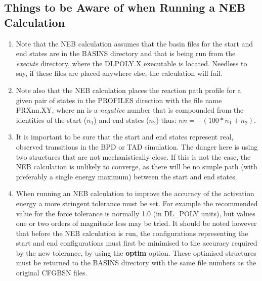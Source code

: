 \subsection{Things to be Aware of when Running a NEB Calculation}

\begin{enumerate}
\item Note that the NEB calculation assumes that the basin files for
the start and end states are in the BASINS directory and that \D{} is
being run from the {\em execute} directory, where the DLPOLY.X
executable is located. Needless to say, if these files are placed
anywhere else, the calculation will fail. 
\item Note also that the NEB
calculation places the reaction path profile for a given pair of
states in the PROFILES direction with the file name PRXnn.XY, where {nn}
is a {\em negative} number that is compounded from the identities of the
start ($n_1$) and end states ($n_2$) thus: $nn=-(100*n_1+n_2)$.
\item It is important to be sure that the start and end states
represent real, observed transitions in the BPD or TAD simulation. The
danger here is using two structures that are not mechanistically
close. If this is not the case, the NEB calculation is unlikely to
converge, as there will be no simple path (with preferably a single
energy maximum) between the start and end states.
\item When running an NEB calculation to improve the
accuracy of the activation energy a more stringent tolerance must be
set. For example the recommended value for the force tolerance is
normally 1.0 (in DL\_POLY units), but values one or two orders of
magnitude less may be tried. It should be noted however that before
the NEB calculation is run, the configurations representing the start
and end configurations must first be minimised to the accuracy
required by the new tolerance, by using the \D{} {\bf optim}
option. These optimised structures must be returned to the BASINS
directory with the same file numbers as the original CFGBSN files.
\end{enumerate}


